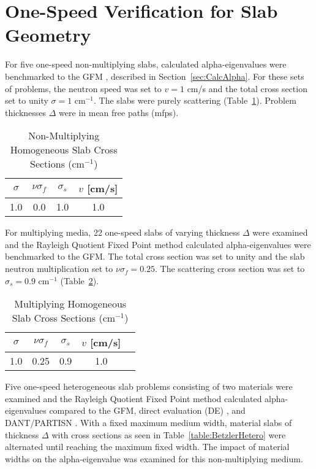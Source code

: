 \section{One-Speed Verification for Slab Geometry}

For five one-speed non-multiplying slabs, calculated alpha-eigenvalues were benchmarked to the GFM \cite{kornreich_timeeigenvalue_2005}, described in Section~\ref{sec:CalcAlpha}. For these sets of problems, the neutron speed was set to $v = 1$ cm/s and the total cross section set to unity $\sigma = 1$ cm$^{-1}$. The slabs were purely scattering (Table~\ref{table:Betzler}). Problem thicknesses $\Delta$ were in mean free paths (mfps).

\begin{table}[H]
    \centering
    \caption{Non-Multiplying Homogeneous Slab Cross Sections (cm$^{-1}$)}
\label{table:Betzler}
    \begin{tabular}{*4c}
        \toprule
	$\sigma$ & $\nu \sigma_{f}$ & $\sigma_{s}$  & $v$ [cm/s] \\ 
        \midrule
	1.0 & 0.0 & 1.0 & 1.0 \\
        \bottomrule
    \end{tabular}
\end{table}

For multiplying media, 22 one-speed slabs of varying thickness $\Delta$ were examined and the Rayleigh Quotient Fixed Point method calculated alpha-eigenvalues were benchmarked to the GFM. The total cross section was set to unity and the slab neutron multiplication set to $\nu \sigma_{f} = 0.25$. The scattering cross section was set to $\sigma_{s} = 0.9$ cm$^{-1}$ (Table~\ref{table:Betzler2}).

\begin{table}[H]
    \centering
    \caption{Multiplying Homogeneous Slab Cross Sections (cm$^{-1}$)}
\label{table:Betzler2}
    \begin{tabular}{*5c}
        \toprule
	$\sigma$ & $\nu \sigma_{f}$ & $\sigma_{s}$ & $v$ [cm/s] \\ 
        \midrule
	1.0 & 0.25 & 0.9 & 1.0 \\
        \bottomrule
    \end{tabular}
\end{table}

Five one-speed heterogeneous slab problems consisting of two materials were examined and the Rayleigh Quotient Fixed Point method calculated alpha-eigenvalues compared to the GFM, direct evaluation (DE) \cite{modak_simple_2003}, and DANT/PARTISN \cite{alcouffe2005partisn}. With a fixed maximum medium width, material slabs of thickness $\Delta$ with cross sections as seen in Table~\ref{table:BetzlerHetero} were alternated until reaching the maximum fixed width. The impact of material widths on the alpha-eigenvalue was examined for this non-multiplying medium.

